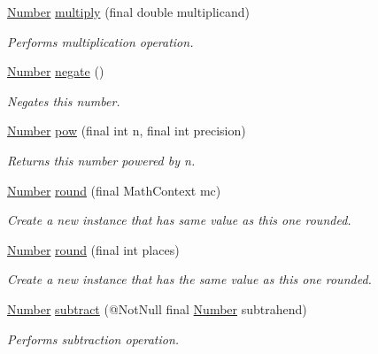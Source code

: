 \begin{DoxyCompactItemize}
\hyperlink{interfacecom_1_1aarrelaakso_1_1drawl_1_1_number}{Number} \hyperlink{classcom_1_1aarrelaakso_1_1drawl_1_1_drawl_number_a5595b3908527eb8a893f9c0a5d061677}{multiply} (final double multiplicand)
\begin{DoxyCompactList}\small\item\em Performs multiplication operation. \end{DoxyCompactList}\item 
\hyperlink{interfacecom_1_1aarrelaakso_1_1drawl_1_1_number}{Number} \hyperlink{classcom_1_1aarrelaakso_1_1drawl_1_1_drawl_number_a7cfa9c1e6042505b82277cb795cc84e3}{negate} ()
\begin{DoxyCompactList}\small\item\em Negates this number. \end{DoxyCompactList}\item 
\hyperlink{interfacecom_1_1aarrelaakso_1_1drawl_1_1_number}{Number} \hyperlink{classcom_1_1aarrelaakso_1_1drawl_1_1_drawl_number_a13f1ea57cce88e852cd7e01b0b3e8cf2}{pow} (final int n, final int precision)
\begin{DoxyCompactList}\small\item\em Returns this number powered by n. \end{DoxyCompactList}\item 
\hyperlink{interfacecom_1_1aarrelaakso_1_1drawl_1_1_number}{Number} \hyperlink{classcom_1_1aarrelaakso_1_1drawl_1_1_drawl_number_aec6cdb055d029b375d5dc72f87926a11}{round} (final Math\+Context mc)
\begin{DoxyCompactList}\small\item\em Create a new instance that has same value as this one rounded. \end{DoxyCompactList}\item 
\hyperlink{interfacecom_1_1aarrelaakso_1_1drawl_1_1_number}{Number} \hyperlink{classcom_1_1aarrelaakso_1_1drawl_1_1_drawl_number_a9755cb62f7e9df1377379aa6781b8de0}{round} (final int places)
\begin{DoxyCompactList}\small\item\em Create a new instance that has the same value as this one rounded. \end{DoxyCompactList}\item 
\hyperlink{interfacecom_1_1aarrelaakso_1_1drawl_1_1_number}{Number} \hyperlink{classcom_1_1aarrelaakso_1_1drawl_1_1_drawl_number_ab5072a1d6694648646b386c3f7e65b0e}{subtract} (@Not\+Null final \hyperlink{interfacecom_1_1aarrelaakso_1_1drawl_1_1_number}{Number} subtrahend)
\begin{DoxyCompactList}\small\item\em Performs subtraction operation. \end{DoxyCompactList}\item 

\end{DoxyCompactItemize}
